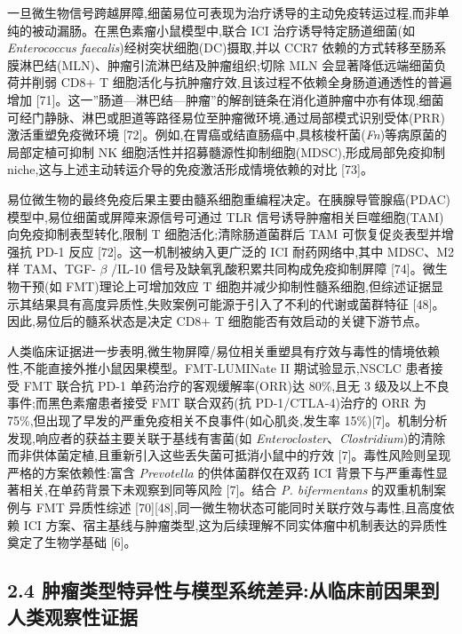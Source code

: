 一旦微生物信号跨越屏障,细菌易位可表现为治疗诱导的主动免疫转运过程,而非单纯的被动漏肠。在黑色素瘤小鼠模型中,联合 ICI 治疗诱导特定肠道细菌(如 \emph{Enterococcus faecalis})经树突状细胞(DC)摄取,并以 CCR7 依赖的方式转移至肠系膜淋巴结(MLN)、肿瘤引流淋巴结及肿瘤组织;切除 MLN 会显著降低远端细菌负荷并削弱 CD8+ T 细胞活化与抗肿瘤疗效,且该过程不依赖全身肠道通透性的普遍增加 {[}71{]}。这一''肠道---淋巴结---肿瘤''的解剖链条在消化道肿瘤中亦有体现,细菌可经门静脉、淋巴或胆道等路径易位至肿瘤微环境,通过局部模式识别受体(PRR)激活重塑免疫微环境 {[}72{]}。例如,在胃癌或结直肠癌中,具核梭杆菌(\emph{Fn})等病原菌的局部定植可抑制 NK 细胞活性并招募髓源性抑制细胞(MDSC),形成局部免疫抑制 niche,这与上述主动转运介导的免疫激活形成情境依赖的对比 {[}73{]}。

易位微生物的最终免疫后果主要由髓系细胞重编程决定。在胰腺导管腺癌(PDAC)模型中,易位细菌或屏障来源信号可通过 TLR 信号诱导肿瘤相关巨噬细胞(TAM)向免疫抑制表型转化,限制 T 细胞活化;清除肠道菌群后 TAM 可恢复促炎表型并增强抗 PD-1 反应 {[}72{]}。这一机制被纳入更广泛的 ICI 耐药网络中,其中 MDSC、M2 样 TAM、TGF- \(\beta\) /IL-10 信号及缺氧乳酸积累共同构成免疫抑制屏障 {[}74{]}。微生物干预(如 FMT)理论上可增加效应 T 细胞并减少抑制性髓系细胞,但综述证据显示其结果具有高度异质性,失败案例可能源于引入了不利的代谢或菌群特征 {[}48{]}。因此,易位后的髓系状态是决定 CD8+ T 细胞能否有效启动的关键下游节点。

人类临床证据进一步表明,微生物屏障/易位相关重塑具有疗效与毒性的情境依赖性,不能直接外推小鼠因果模型。FMT-LUMINate II 期试验显示,NSCLC 患者接受 FMT 联合抗 PD-1 单药治疗的客观缓解率(ORR)达 80\%,且无 3 级及以上不良事件;而黑色素瘤患者接受 FMT 联合双药(抗 PD-1/CTLA-4)治疗的 ORR 为 75\%,但出现了早发的严重免疫相关不良事件(如心肌炎,发生率 15\%){[}7{]}。机制分析发现,响应者的获益主要关联于基线有害菌(如 \emph{Enterocloster}、\emph{Clostridium})的清除而非供体菌定植,且重新引入这些丢失菌可抵消小鼠中的疗效 {[}7{]}。毒性风险则呈现严格的方案依赖性:富含 \emph{Prevotella} 的供体菌群仅在双药 ICI 背景下与严重毒性显著相关,在单药背景下未观察到同等风险 {[}7{]}。结合 \emph{P. bifermentans} 的双重机制案例与 FMT 异质性综述 {[}70{]}{[}48{]},同一微生物状态可能同时关联疗效与毒性,且高度依赖 ICI 方案、宿主基线与肿瘤类型,这为后续理解不同实体瘤中机制表达的异质性奠定了生物学基础 {[}6{]}。

\subsection{2.4 肿瘤类型特异性与模型系统差异:从临床前因果到人类观察性证据}\label{ux80bfux7624ux7c7bux578bux7279ux5f02ux6027ux4e0eux6a21ux578bux7cfbux7edfux5deeux5f02ux4eceux4e34ux5e8aux524dux56e0ux679cux5230ux4ebaux7c7bux89c2ux5bdfux6027ux8bc1ux636e}

